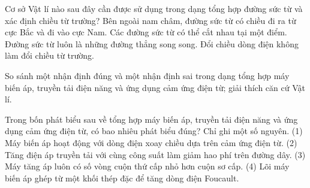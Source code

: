 \begin{ex}
Cơ sở Vật lí nào sau đây cần được sử dụng trong dạng tổng hợp đường sức từ và xác định chiều từ trường?
\choice
{\True Bên ngoài nam châm, đường sức từ có chiều đi ra từ cực Bắc và đi vào cực Nam.}
{Các đường sức từ có thể cắt nhau tại một điểm.}
{Đường sức từ luôn là những đường thẳng song song.}
{Đổi chiều dòng điện không làm đổi chiều từ trường.}
\end{ex}

\begin{bt}
So sánh một nhận định đúng và một nhận định sai trong dạng tổng hợp máy biến áp, truyền tải điện năng và ứng dụng cảm ứng điện từ; giải thích căn cứ Vật lí.
\end{bt}

\begin{ex}
Trong bốn phát biểu sau về tổng hợp máy biến áp, truyền tải điện năng và ứng dụng cảm ứng điện từ, có bao nhiêu phát biểu đúng? Chỉ ghi một số nguyên. (1) Máy biến áp hoạt động với dòng điện xoay chiều dựa trên cảm ứng điện từ. (2) Tăng điện áp truyền tải với cùng công suất làm giảm hao phí trên đường dây. (3) Máy tăng áp luôn có số vòng cuộn thứ cấp nhỏ hơn cuộn sơ cấp. (4) Lõi máy biến áp ghép từ một khối thép đặc để tăng dòng điện Foucault.
\end{ex}

